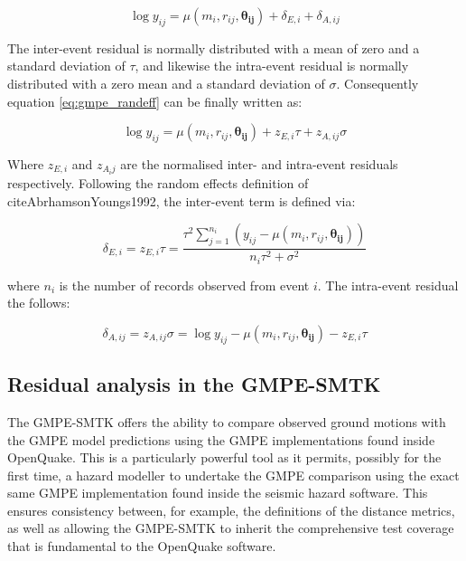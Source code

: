 \begin{equation}
\log y_{ij} = \mu \left( {m_i, r_{ij}, \mathbf{\theta_{ij}}} \right) +  \delta_{E, i} + \delta_{A, ij}
\label{eq:gmpe_randeff}
\end{equation}

The inter-event residual is normally distributed with a mean of zero and a standard deviation of $\tau$, and likewise the intra-event residual is normally distributed with a zero mean and a standard deviation of $\sigma$. 
Consequently equation \ref{eq:gmpe_randeff} can be finally written as:

\begin{equation}
\log y_{ij} = \mu \left( {m_i, r_{ij}, \mathbf{\theta_{ij}}} \right) +  z_{E,i}\tau + z_{A, ij}\sigma
\label{eq:gmpe_re_resid}
\end{equation}

Where $z_{E, i}$ and $z_{A_ ij}$ are the normalised inter- and intra-event residuals respectively. Following the random effects definition of cite{AbrhamsonYoungs1992}, the inter-event term is defined via:

\begin{equation}
\delta_{E, i} = z_{E, i} \tau = \frac{\tau^2 \sum\limits_{j = 1}^{n_i} \left( {y_{ij} - \mu \left( {m_i, r_{ij}, \mathbf{\theta_{ij}}} \right)}\right)}{n_i \tau^2 + \sigma^2}
\label{eq:inter_res}
\end{equation}

\noindent where $n_i$ is the number of records observed from event $i$. The intra-event residual the follows:

\begin{equation}
\delta_{A, ij} = z_{A, ij}\sigma = \log y_{ij} - \mu \left( {m_i, r_{ij}, \mathbf{\theta_{ij}}} \right) - z_{E, i}\tau
\label{eq:intra_res}
\end{equation}

\subsection{Residual analysis in the GMPE-SMTK}

The GMPE-SMTK offers the ability to compare observed ground motions with the GMPE model predictions using the GMPE implementations found inside OpenQuake. This is a particularly powerful tool as it permits, possibly for the first time, a hazard modeller to undertake the GMPE comparison using the exact same GMPE implementation found inside the seismic hazard software. This ensures consistency between, for example, the definitions of the distance metrics, as well as allowing the GMPE-SMTK to inherit the comprehensive test coverage that is fundamental to the OpenQuake software. 

